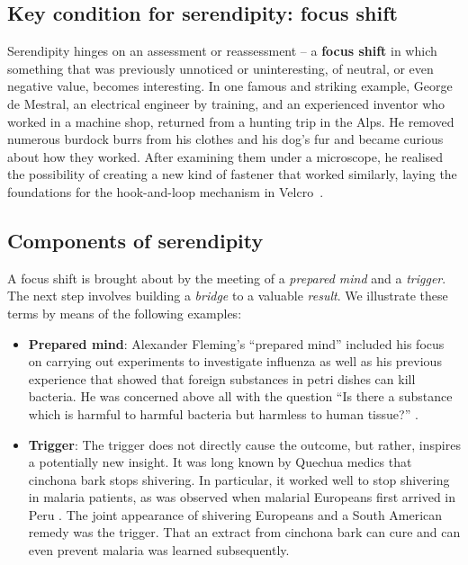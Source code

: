 
\subsection{Key condition for serendipity: focus shift}

Serendipity hinges on an assessment or reassessment -- a
\textbf{focus shift} in which something that was previously unnoticed
or uninteresting, of neutral, or even negative value, becomes
interesting.  In one famous and striking example, George de Mestral,
an electrical engineer by training, and an experienced inventor who
worked in a machine shop, returned from a hunting trip in the Alps. He
removed numerous burdock burrs from his clothes and his dog's fur and
became curious about how they worked. After examining them under a
microscope, he realised the possibility of creating a new kind of
fastener that worked similarly, laying the foundations for
the hook-and-loop mechanism in Velcro\texttrademark\ \cite{roberts}.

\subsection{Components of serendipity}

A focus shift is brought about by the meeting of a \emph{prepared mind} and a \emph{trigger}.  The next step involves building a \emph{bridge} to a valuable \emph{result}. We illustrate these terms by means of the following examples:

\begin{itemize}
\item \textbf{Prepared mind}: 
Alexander Fleming's ``prepared mind'' included his focus
on carrying out experiments to investigate influenza as well as his
previous experience that showed that foreign substances in petri dishes can kill
bacteria.  He was concerned above all with the question ``Is there a
substance which is harmful to harmful bacteria but harmless to human
tissue?''  \cite[p. 161]{roberts}.
\end{itemize}

\begin{itemize}
\item \textbf{Trigger}: The trigger does not directly cause the
  outcome, but rather, inspires a potentially new insight.  It was
  long known by Quechua medics that cinchona bark stops shivering.  In
  particular, it worked well to stop shivering in malaria patients, as
  was observed when malarial Europeans first arrived in Peru
  \cite[pp.~75--77]{desowitz1997gave}.  The joint appearance of shivering
  Europeans and a South American remedy was the trigger.  That an
  extract from cinchona bark can cure and can even prevent malaria was
  learned subsequently.
\end{itemize}

